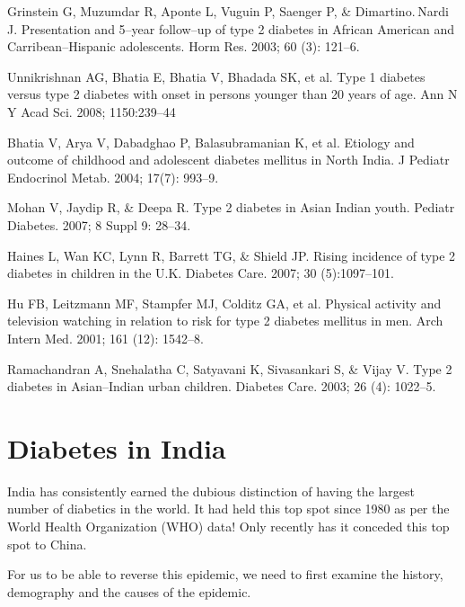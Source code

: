 \begin{thebibliography}{99}
 Grinstein G, Muzumdar R, Aponte L, Vuguin P, Saenger P, \& Dimartino. Nardi J. Presentation and 5–year follow–up of type 2 diabetes in African American and Carribean–Hispanic adolescents. Horm Res. 2003; 60 (3): 121–6.

  Unnikrishnan AG, Bhatia E, Bhatia V, Bhadada SK, et al. Type 1 diabetes versus type 2 diabetes with onset in persons younger than 20 years of age. Ann N Y Acad Sci. 2008; 1150:239–44

  Bhatia V, Arya V, Dabadghao P, Balasubramanian K, et al. Etiology and outcome of childhood and adolescent diabetes mellitus in North India. J Pediatr Endocrinol Metab. 2004; 17(7): 993–9.

  Mohan V, Jaydip R, \& Deepa R. Type 2 diabetes in Asian Indian youth. Pediatr Diabetes. 2007; 8 Suppl 9: 28–34.

  Haines L, Wan KC, Lynn R, Barrett TG, \& Shield JP. Rising incidence of type 2 diabetes in children in the U.K. Diabetes Care. 2007; 30 (5):1097–101.

  Hu FB, Leitzmann MF, Stampfer MJ, Colditz GA, et al. Physical activity and television watching in relation to risk for type 2 diabetes mellitus in men. Arch Intern Med. 2001; 161 (12): 1542–8.

  Ramachandran A, Snehalatha C, Satyavani K, Sivasankari S, \& Vijay V. Type 2 diabetes in Asian–Indian urban children. Diabetes Care. 2003; 26 (4): 1022–5.

 \end{thebibliography}


\chapter{Diabetes in India}\label{chap8}


India has consistently earned the dubious distinction of having the largest number of diabetics in the world. It had held this top spot since 1980 as per the World Health Organization (WHO) data! Only recently has it conceded this top spot to China.

For us to be able to reverse this epidemic, we need to first examine the history, demography and the causes of the epidemic.

